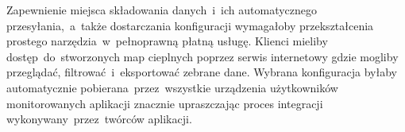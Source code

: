 Zapewnienie miejsca składowania danych~i~ich automatycznego przesyłania,~a~także dostarczania konfiguracji wymagałoby przekształcenia prostego narzędzia~w~pełnoprawną płatną usługę. Klienci mieliby dostęp~do~stworzonych map cieplnych poprzez serwis internetowy gdzie mogliby przeglądać, filtrować~i~eksportować zebrane dane. Wybrana konfiguracja byłaby automatycznie pobierana~przez~wszystkie urządzenia użytkowników monitorowanych aplikacji znacznie upraszczając proces integracji wykonywany~przez~twórców aplikacji.
